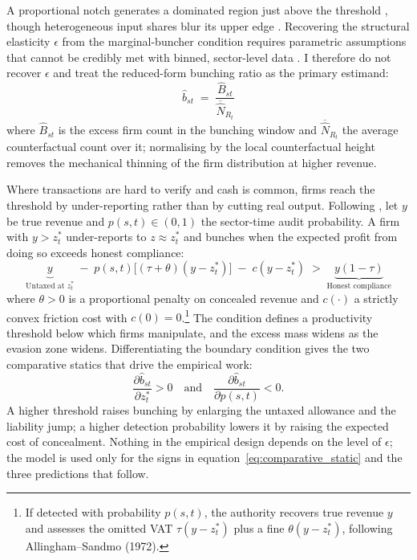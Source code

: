 \documentclass[12pt,oneside,a4paper]{report}
\begin{document}
A proportional notch generates a dominated region just above the threshold \parencite{kleven2013using, kleven2016bunching}, though heterogeneous input shares blur its upper edge \parencite{harju2019compliance, liu2021vat}. Recovering the structural elasticity $\epsilon$ from the marginal-buncher condition requires parametric assumptions that cannot be credibly met with binned, sector-level data \parencite{blomquist2021bunching}. I therefore do not recover $\epsilon$ and treat the reduced-form bunching ratio as the primary estimand:
\begin{equation}
    \hat{b}_{st}
    \;=\;
    \frac{\hat{B}_{st}}{\overline{\hat{N}}_{R_t}}
    \label{eq:b_hat_theory}
\end{equation}
where $\hat{B}_{st}$ is the excess firm count in the bunching window and $\overline{\hat N}_{R_t}$ the average counterfactual count over it; normalising by the local counterfactual height removes the mechanical thinning of the firm distribution at higher revenue.

Where transactions are hard to verify and cash is common, firms reach the threshold by under-reporting rather than by cutting real output. Following \textcite{allingham1972income}, let $y$ be true revenue and $p(s,t) \in (0,1)$ the sector-time audit probability. A firm with $y > z^*_t$ under-reports to $z \approx z^*_t$ and bunches when the expected profit from doing so exceeds honest compliance:
\begin{equation}
\underbrace{y}_{\text{Untaxed at }z^*_t}
\;-\; p(s,t)\bigl[(\tau+\theta)(y-z^*_t)\bigr]
\;-\; c(y-z^*_t)
\;>\;
\underbrace{y(1-\tau)}_{\text{Honest compliance}}
\label{eq:bunching_condition}
\end{equation}
where $\theta > 0$ is a proportional penalty on concealed revenue and $c(\cdot)$ a strictly convex friction cost with $c(0)=0$.\footnote{If detected with probability $p(s,t)$, the authority recovers true revenue $y$ and assesses the omitted VAT $\tau(y-z^*_t)$ plus a fine $\theta(y-z^*_t)$, following Allingham--Sandmo (1972).} The condition defines a productivity threshold below which firms manipulate, and the excess mass widens as the evasion zone widens. Differentiating the boundary condition gives the two comparative statics that drive the empirical work:
\begin{equation}
    \frac{\partial\hat{b}_{st}}{\partial z^*_t} > 0
    \quad \text{and} \quad
    \frac{\partial\hat{b}_{st}}{\partial p(s,t)} < 0 .
    \label{eq:comparative_static}
\end{equation}
A higher threshold raises bunching by enlarging the untaxed allowance and the liability jump; a higher detection probability lowers it by raising the expected cost of concealment. Nothing in the empirical design depends on the level of $\epsilon$; the model is used only for the signs in equation~\eqref{eq:comparative_static} and the three predictions that follow.
\end{document}

